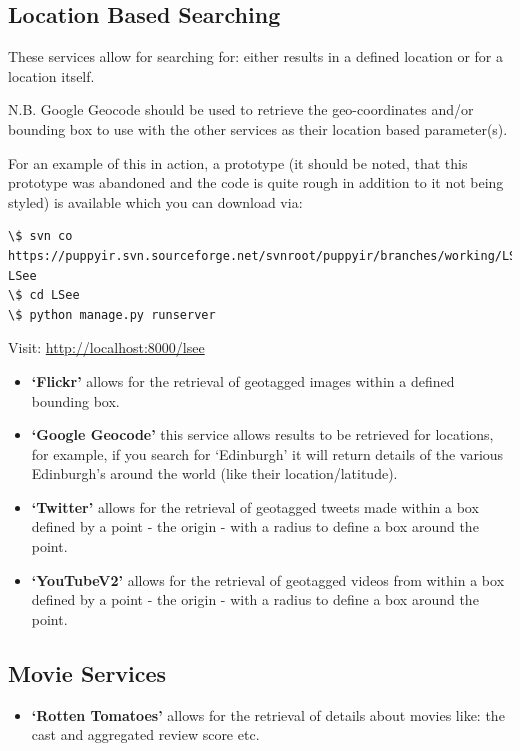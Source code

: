\documentclass[letterpaper,10pt,english]{sphinxmanual}
\begin{document}
\subsection{Location Based Searching}
\label{wrappers:location-based-searching}
These services allow for searching for: either results in a defined location or for a location itself.

N.B. Google Geocode should be used to retrieve the geo-coordinates and/or bounding box to use with the other services as their location based parameter(s).

For an example of this in action, a prototype (it should be noted, that this prototype was abandoned and the code is quite rough in addition to it not being styled) is available which you can download via:

\begin{Verbatim}[commandchars=\\\{\}]
\$ svn co https://puppyir.svn.sourceforge.net/svnroot/puppyir/branches/working/LSee LSee
\$ cd LSee
\$ python manage.py runserver
\end{Verbatim}

Visit: \href{http://localhost:8000/lsee}{http://localhost:8000/lsee}
\begin{itemize}
\item {} 
\textbf{`Flickr'} allows for the retrieval of geotagged images within a defined bounding box.

\item {} 
\textbf{`Google Geocode'} this service allows results to be retrieved for locations, for example, if you search for `Edinburgh' it will return details of the various Edinburgh's around the world (like their location/latitude).

\item {} 
\textbf{`Twitter'} allows for the retrieval of geotagged tweets made within a box defined by a point - the origin - with a radius to define a box around the point.

\item {} 
\textbf{`YouTubeV2'} allows for the retrieval of geotagged videos from within a box defined by a point - the origin - with a radius to define a box around the point.

\end{itemize}


\subsection{Movie Services}
\label{wrappers:movie-services}\begin{itemize}
\item {} 
\textbf{`Rotten Tomatoes'} allows for the retrieval of details about movies like: the cast and aggregated review score etc.

\end{itemize}
\end{document}
